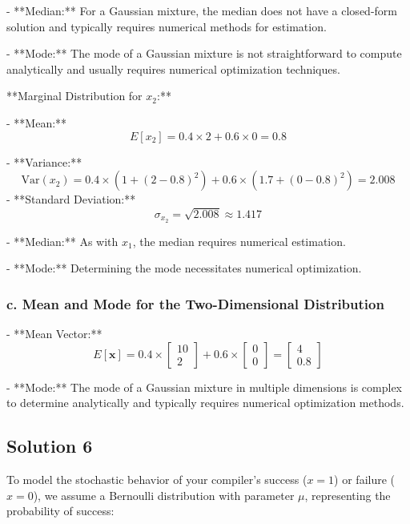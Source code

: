 \documentclass[12pt]{article}
\begin{document}
- **Median:**
  For a Gaussian mixture, the median does not have a closed-form solution and typically requires numerical methods for estimation.

- **Mode:**
  The mode of a Gaussian mixture is not straightforward to compute analytically and usually requires numerical optimization techniques.

**Marginal Distribution for \( x_2 \):**

- **Mean:**
  \[
  E[x_2] = 0.4 \times 2 + 0.6 \times 0 = 0.8
  \]

- **Variance:**
  \[
  \text{Var}(x_2) = 0.4 \times (1 + (2 - 0.8)^2) + 0.6 \times (1.7 + (0 - 0.8)^2) = 2.008
  \]
  - **Standard Deviation:**
    \[
    \sigma_{x_2} = \sqrt{2.008} \approx 1.417
    \]

- **Median:**
  As with \( x_1 \), the median requires numerical estimation.

- **Mode:**
  Determining the mode necessitates numerical optimization.

\subsubsection*{c. Mean and Mode for the Two-Dimensional Distribution}

- **Mean Vector:**
  \[
  E[\mathbf{x}] = 0.4 \times \begin{bmatrix} 10 \\ 2 \end{bmatrix} + 0.6 \times \begin{bmatrix} 0 \\ 0 \end{bmatrix} = \begin{bmatrix} 4 \\ 0.8 \end{bmatrix}
  \]

- **Mode:**
  The mode of a Gaussian mixture in multiple dimensions is complex to determine analytically and typically requires numerical optimization methods.




\subsection*{Solution 6}

To model the stochastic behavior of your compiler's success (\( x = 1 \)) or failure (\( x = 0 \)), we assume a Bernoulli distribution with parameter \( \mu \), representing the probability of success:
\end{document}
